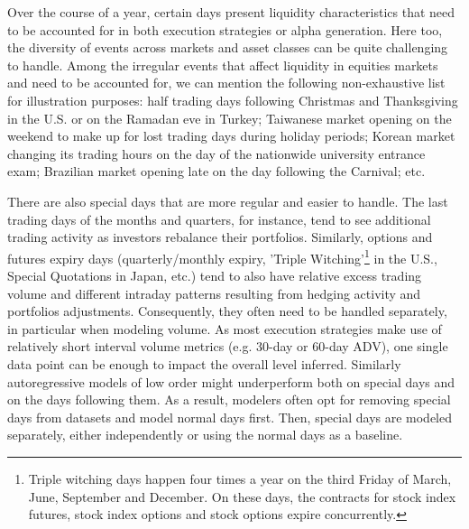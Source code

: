 \begin{itemize}
Over the course of a year, certain days present liquidity characteristics that need to be accounted for in both execution strategies or alpha generation. Here too, the diversity of events across markets and asset classes can be quite challenging to handle. Among the irregular events that affect liquidity in equities markets and need to be accounted for, we can mention the following non-exhaustive list for illustration purposes: half trading days following Christmas and Thanksgiving in the U.S. or on the Ramadan eve in Turkey; Taiwanese market opening on the weekend to make up for lost trading days during holiday periods; Korean market changing its trading hours on the day of the nationwide university entrance exam; Brazilian market opening late on the day following the Carnival; etc. 

There are also special days that are more regular and easier to handle. The last trading days of the months and quarters, for instance, tend to see additional trading activity as investors rebalance their portfolios. Similarly, options and futures expiry days (quarterly/monthly expiry, 'Triple Witching'\footnote{Triple witching days happen four times a year on the third Friday of March, June, September and December. On these days, the contracts for stock index futures, stock index options and stock options expire concurrently.} in the U.S., Special Quotations in Japan, etc.) tend to also have relative excess trading volume and different intraday patterns resulting from hedging activity and portfolios adjustments. Consequently, they often need to be handled separately, in particular when modeling volume. As most execution strategies make use of relatively short interval volume metrics (e.g. 30-day or 60-day ADV), one single data point can be enough to impact the overall level inferred. Similarly autoregressive models of low order might underperform both on special days and on the days following them. As a result, modelers often opt for removing special days from datasets and model normal days first. Then, special days are modeled separately, either independently or using the normal days as a baseline. 


\end{itemize}
